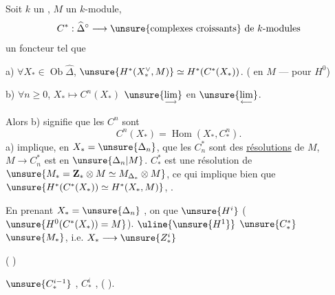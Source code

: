 
Soit $k$ un , $M$ un $k$-module,
\[
C^*:\widehat{\Delta}^{\circ}\longrightarrow
\text{\unsure{complexes croissants} de $k$-modules}
\]
un foncteur  tel que

a) $\forall X_*\in\operatorname{Ob}\widehat{\Delta}$,
$\unsure{H^*(X_*^\vee,M)}\simeq H^*(C^*(X_*))$.
( en $M$ ---  pour $H^0$)

b) $\forall n\geq 0$, $X_*\longmapsto C^n(X_*)$
 $\unsure{\underset{\longrightarrow}{\lim}}$ en
$\unsure{\underset{\longleftarrow}{\lim}}$.

Alors b) signifie que les $C^n$ sont 
\[
C^n(X_*)=\operatorname{Hom}(X_*,C_*^n).
\]
a) implique, en  $X_*=\unsure{\Delta_n}$, que les
$C_n^*$ sont des \uline{résolutions} de $M$, 
$M\longrightarrow C_n^*$ est  en $\unsure{\Delta_n|M}$.
$C_*^*$ est une résolution de
$\unsure{M_*=\mathbf Z_*\otimes M\simeq M_{\Delta_*}\otimes M}$,
ce qui implique bien que 
$\unsure{H^*(C^*(X_*))\simeq H^*(X_*,M)}$,
 .

En prenant $X_*=\unsure{\Delta_n}$ , on 
que $\unsure{H^i}$ 
($\unsure{H^0(C^*(X_*))=M}$).
 $\uline{\unsure{H^1}}$  
$\unsure{C_*^*}$ 
 $\unsure{M_*}$\unsure{)}, i.e.
 $X_*\longrightarrow\unsure{Z_*^i}$

(
)

  $\unsure{C_*^{i-1}}$ ,
 
  
$C_*^i$ ,
(   ).

